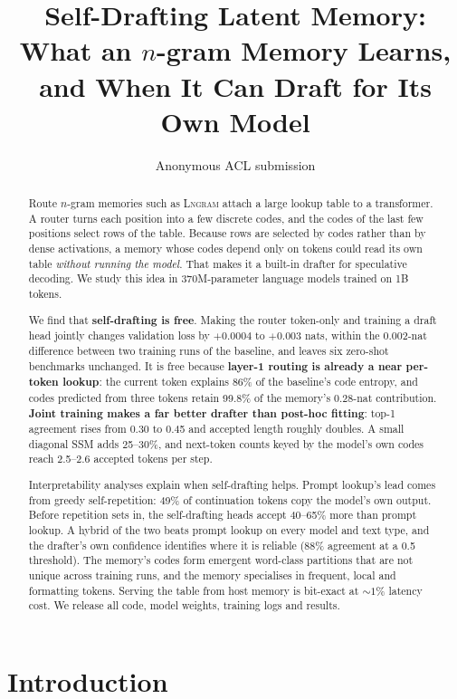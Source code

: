 \documentclass[11pt]{article}
\title{Self-Drafting Latent Memory: What an $n$-gram Memory Learns,\\and When It Can Draft for Its Own Model}
\author{Anonymous ACL submission}
\newcommand{\Lngram}{\textsc{Lngram}}
\newif\ifshowlinks
\newcommand{\releasenote}{\ifshowlinks\footnote{Weights:
  \url{https://huggingface.co/afoolishman/self-drafting-latent-memory}. Training logs:
  \url{https://forge.coreweave.com/wandb/kishor-iiit-hyderabad/morbius-wave3}.}\fi}
\begin{document}
\maketitle

\begin{abstract}
Route $n$-gram memories such as \Lngram{} attach a large lookup table to a transformer. A router turns each position
into a few discrete codes, and the codes of the last few positions select rows of the table. Because rows are selected
by codes rather than by dense activations, a memory whose codes depend only on tokens could read its own table
\emph{without running the model}. That makes it a built-in drafter for speculative decoding. We study this idea in 370M-parameter
language models trained on 1B tokens.

We find that \textbf{self-drafting is free}. Making the router token-only and training a draft head jointly changes
validation loss by $+0.0004$ to $+0.003$ nats, within the 0.002-nat difference between two training runs of the baseline,
and leaves six zero-shot benchmarks unchanged. It is free because \textbf{layer-1 routing is already a near per-token
lookup}: the current token explains 86\% of the baseline's code entropy, and codes predicted from three tokens retain 99.8\%
of the memory's 0.28-nat contribution. \textbf{Joint training makes a far better drafter than post-hoc fitting}: top-1
agreement rises from 0.30 to 0.45 and accepted length roughly doubles. A small diagonal SSM adds 25--30\%, and next-token
counts keyed by the model's own codes reach 2.5--2.6 accepted tokens per step.

Interpretability analyses explain when self-drafting helps. Prompt lookup's lead comes from greedy self-repetition:
49\% of continuation tokens copy the model's own output. Before repetition sets in, the self-drafting heads accept
40--65\% more than prompt lookup. A hybrid of the two beats prompt lookup on every model and text type, and the drafter's
own confidence identifies where it is reliable (88\% agreement at a 0.5 threshold). The memory's codes form emergent
word-class partitions that are not unique across training runs, and the memory specialises in frequent, local and
formatting tokens. Serving the table from host memory is bit-exact at ${\sim}1\%$ latency cost. We release all code,
model weights, training logs and results.\releasenote
\end{abstract}

\section{Introduction}
\end{document}
